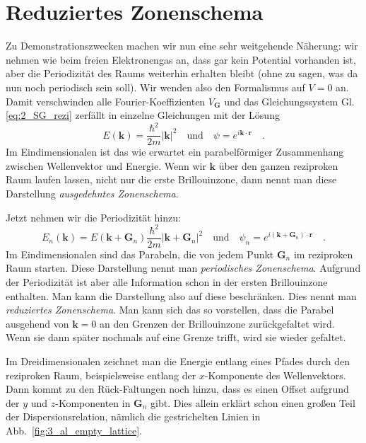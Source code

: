 \section{Reduziertes Zonenschema}

Zu Demonstrationszwecken machen wir nun eine sehr weitgehende Näherung: wir nehmen wie beim freien Elektronengas an, dass gar kein Potential vorhanden ist, aber die Periodizität des Raums weiterhin erhalten bleibt (ohne zu sagen, was da nun noch periodisch sein soll). Wir wenden also den Formalismus auf $V=0$ an. Damit verschwinden alle Fourier-Koeffizienten $V_\mathbf{G}$ und das Gleichungssystem Gl. \ref{eq:2_SG_rezi} zerfällt in einzelne Gleichungen mit der Lösung
\begin{equation}
    E(\mathbf{k}) = \frac{\hbar^2}{2m} \left| \mathbf{k}  \right|^2 
    \quad \text{und} \quad 
    \psi = e^{i \mathbf{k} \cdot \mathbf{r}} \quad .
\end{equation}
Im Eindimensionalen ist das  wie erwartet ein parabelförmiger Zusammenhang zwischen Wellenvektor und Energie. Wenn wir $\mathbf{k}$ über den ganzen reziproken Raum laufen lassen, nicht nur die erste Brillouinzone, dann nennt man diese Darstellung \emph{ausgedehntes Zonenschema}.

Jetzt nehmen wir die Periodizität hinzu:
\begin{equation}
    E_n(\mathbf{k}) = E(\mathbf{k} + \mathbf{G}_n) \frac{\hbar^2}{2m} \left| \mathbf{k} + \mathbf{G}_n \right|^2 \quad \text{und} \quad \psi_n = e^{i (\mathbf{k} + \mathbf{G}_n) \cdot \mathbf{r}} \quad .
\end{equation}
Im Eindimensionalen sind das Parabeln, die von jedem Punkt  $\mathbf{G}_n $ im reziproken Raum starten. Diese Darstellung nennt man \emph{periodisches Zonenschema}. Aufgrund der Periodizität ist aber alle Information schon in der ersten Brillouinzone enthalten. Man kann die Darstellung also auf diese beschränken. Dies nennt man  \emph{reduziertes Zonenschema}. Man kann sich das so vorstellen, dass die Parabel ausgehend von  $\mathbf{k} = 0$  an den Grenzen der Brillouinzone zurückgefaltet wird. Wenn sie dann später nochmals auf eine Grenze trifft, wird sie wieder gefaltet.


Im Dreidimensionalen zeichnet man die Energie entlang eines Pfades durch den reziproken Raum, beispielsweise entlang der $x$-Komponente des Wellenvektors. Dann 
kommt zu den Rück-Faltungen noch hinzu, dass es einen Offset aufgrund der $y$ und $z$-Komponenten in $\mathbf{G}_n $ gibt. Dies allein erklärt schon einen großen Teil der Dispersionsrelation, nämlich die gestrichelten Linien in Abb.~\ref{fig:3_al_empty_lattice}.

